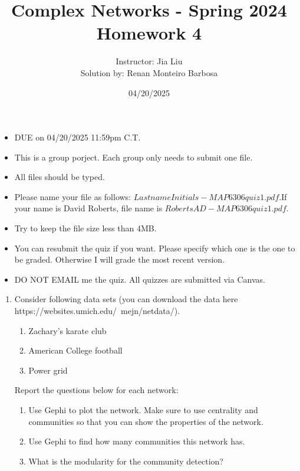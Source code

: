 \documentclass{amsart}
\theoremstyle{definition}
\theoremstyle{remark}
\numberwithin{equation}{section}
\begin{document}
\title{Complex Networks  - Spring 2024\\{\bf Homework 4}}%
\author{Instructor: Jia Liu \\ Solution by: Renan Monteiro Barbosa}%
\date{04/20/2025}


\maketitle
\begin{itemize}
\item DUE on  04/20/2025 11:59pm C.T.
\item This is a group porject. Each group only needs to submit one file.
\item All files should be typed. 
\item Please name your file as follows: $LastnameInitials-MAP6306quiz1.pdf$.If your name is  David Roberts, file name is $RobertsAD-MAP6306quiz1.pdf$.
\item Try to keep the file size less than 4MB.
\item You can resubmit the quiz if you want. Please specify which one is the one to be graded. Otherwise I will grade the most recent version.
\item DO NOT EMAIL me the quiz. All quizzes are submitted via Canvas.
\end{itemize}


\clearpage
\begin{enumerate}


\item Consider following data sets (you can download the data here https://websites.umich.edu/~mejn/netdata/).
\begin{enumerate}
\item Zachary's karate club
\item American College football
\item Power grid
\end{enumerate}

\vspace{2cm}

Report the questions below for each network:
\begin{enumerate}
\item Use Gephi to plot the network. Make sure to use centrality and communities so that you can show the properties of the network.
\item Use Gephi to find how many communities this network has. 
\item What is the modularity for the community detection?
\end{enumerate}
\end{enumerate}
\end{document}
